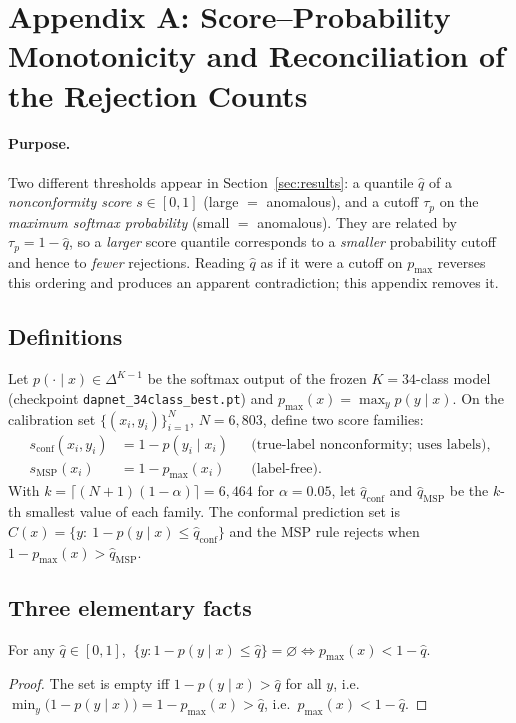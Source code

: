 \section{Appendix A: Score--Probability Monotonicity and Reconciliation of the Rejection Counts}
\label{app:monotonicity}

\paragraph{Purpose.}
Two different thresholds appear in Section~\ref{sec:results}: a quantile $\hat q$ of a
\emph{nonconformity score} $s\in[0,1]$ (large $=$ anomalous), and a cutoff $\tau_p$ on the
\emph{maximum softmax probability} (small $=$ anomalous). They are related by
$\tau_p=1-\hat q$, so a \emph{larger} score quantile corresponds to a \emph{smaller} probability
cutoff and hence to \emph{fewer} rejections. Reading $\hat q$ as if it were a cutoff on $p_{\max}$ reverses
this ordering and produces an apparent contradiction; this appendix removes it.

\subsection{Definitions}
Let $p(\cdot\mid x)\in\Delta^{K-1}$ be the softmax output of the frozen $K=34$-class model
(checkpoint \texttt{dapnet\_34class\_best.pt}) and $p_{\max}(x)=\max_y p(y\mid x)$. On the
calibration set $\{(x_i,y_i)\}_{i=1}^{N}$, $N=6{,}803$, define two score families:
\begin{align}
  s_{\mathrm{conf}}(x_i,y_i)&=1-p(y_i\mid x_i) &&\text{(true-label nonconformity; uses labels)},\\
  s_{\mathrm{MSP}}(x_i)&=1-p_{\max}(x_i) &&\text{(label-free).}
\end{align}
With $k=\lceil(N+1)(1-\alpha)\rceil=6{,}464$ for $\alpha=0.05$, let $\hat q_{\mathrm{conf}}$ and
$\hat q_{\mathrm{MSP}}$ be the $k$-th smallest value of each family. The conformal prediction set is
$C(x)=\{y:\ 1-p(y\mid x)\le\hat q_{\mathrm{conf}}\}$ and the MSP rule rejects when
$1-p_{\max}(x)>\hat q_{\mathrm{MSP}}$.

\subsection{Three elementary facts}
\begin{lemma}\label{lem:cutoff}
For any $\hat q\in[0,1]$, $\ \{y:1-p(y\mid x)\le\hat q\}=\varnothing\iff p_{\max}(x)<1-\hat q$.
\end{lemma}
\begin{proof}
The set is empty iff $1-p(y\mid x)>\hat q$ for all $y$, i.e.\ $\min_y\bigl(1-p(y\mid x)\bigr)=1-p_{\max}(x)>\hat q$,
i.e.\ $p_{\max}(x)<1-\hat q$.
\end{proof}

